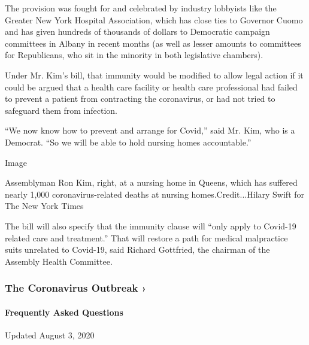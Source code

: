 The provision was fought for and celebrated by industry lobbyists like
the Greater New York Hospital Association, which has close ties to
Governor Cuomo and has given hundreds of thousands of dollars to
Democratic campaign committees in Albany in recent months (as well as
lesser amounts to committees for Republicans, who sit in the minority in
both legislative chambers).

Under Mr. Kim's bill, that immunity would be modified to allow legal
action if it could be argued that a health care facility or health care
professional had failed to prevent a patient from contracting the
coronavirus, or had not tried to safeguard them from infection.

``We now know how to prevent and arrange for Covid,'' said Mr. Kim, who
is a Democrat. ``So we will be able to hold nursing homes accountable.''

Image

Assemblyman Ron Kim, right, at a nursing home in Queens, which has
suffered nearly 1,000 coronavirus-related deaths at nursing
homes.Credit...Hilary Swift for The New York Times

The bill will also specify that the immunity clause will ``only apply to
Covid-19 related care and treatment.'' That will restore a path for
medical malpractice suits unrelated to Covid-19, said Richard Gottfried,
the chairman of the Assembly Health Committee.

\href{https://www.nytimes.com/news-event/coronavirus?action=click\&pgtype=Article\&state=default\&region=MAIN_CONTENT_3\&context=storylines_faq}{}

\hypertarget{the-coronavirus-outbreak-}{%
\subsubsection{The Coronavirus Outbreak
›}\label{the-coronavirus-outbreak-}}

\hypertarget{frequently-asked-questions}{%
\paragraph{Frequently Asked
Questions}\label{frequently-asked-questions}}

Updated August 3, 2020

